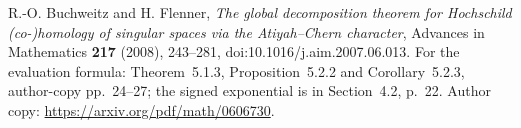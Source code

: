 R.-O. Buchweitz and H. Flenner,
\emph{The global decomposition theorem for Hochschild (co-)homology
of singular spaces via the Atiyah--Chern character},
Advances in Mathematics \textbf{217} (2008), 243--281,
doi:10.1016/j.aim.2007.06.013.
For the evaluation formula: Theorem~5.1.3, Proposition~5.2.2 and
Corollary~5.2.3, author-copy pp.~24--27; the signed exponential is
in Section~4.2, p.~22.
Author copy: \url{https://arxiv.org/pdf/math/0606730}.
